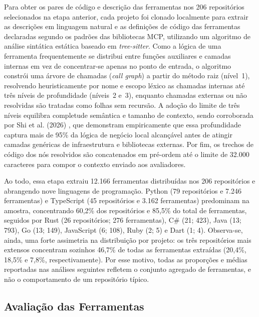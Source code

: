 Para obter os pares de código e descrição das ferramentas nos 206 repositórios selecionados na etapa anterior, cada projeto foi clonado localmente para extrair as descrições em linguagem natural e as definições de código das ferramentas declaradas segundo os padrões das bibliotecas MCP, utilizando um algoritmo de análise sintática estática baseado em \textit{tree-sitter}. Como a lógica de uma ferramenta frequentemente se distribui entre funções auxiliares e camadas internas em vez de concentrar-se apenas no ponto de entrada, o algoritmo constrói uma árvore de chamadas (\textit{call graph}) a partir do método raiz (nível~1), resolvendo heuristicamente por nome e escopo léxico as chamadas internas até três níveis de profundidade (níveis~2 e~3), enquanto chamadas externas ou não resolvidas são tratadas como folhas sem recursão. A adoção do limite de três níveis equilibra completude semântica e tamanho de contexto, sendo corroborada por Shi et al. (2026) \nocite{shi2026description}, que demonstram empiricamente que essa profundidade captura mais de 95\% da lógica de negócio local alcançável antes de atingir camadas genéricas de infraestrutura e bibliotecas externas. Por fim, os trechos de código dos nós resolvidos são concatenados em pré-ordem até o limite de 32.000 caracteres para compor o contexto enviado aos avaliadores.

Ao todo, essa etapa extraiu 12.166 ferramentas distribuídas nos 206 repositórios e abrangendo nove linguagens de programação. Python (79 repositórios e 7.246 ferramentas) e TypeScript (45 repositórios e 3.162 ferramentas) predominam na amostra, concentrando 60,2\% dos repositórios e 85,5\% do total de ferramentas, seguidos por Rust (26 repositórios; 276 ferramentas), C\# (21; 423), Java (13; 793), Go (13; 149), JavaScript (6; 108), Ruby (2; 5) e Dart (1; 4). Observa-se, ainda, uma forte assimetria na distribuição por projeto: os três repositórios mais extensos concentram sozinhos 46,7\% de todas as ferramentas extraídas (20,4\%, 18,5\% e 7,8\%, respectivamente). Por esse motivo, todas as proporções e médias reportadas nas análises seguintes refletem o conjunto agregado de ferramentas, e não o comportamento de um repositório típico.

\subsection{Avaliação das Ferramentas}
\label{subsec:classificacao}

